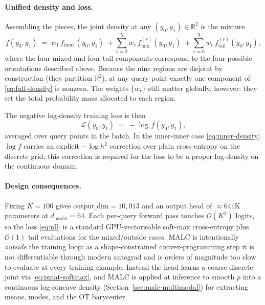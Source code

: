 \paragraph{Unified density and loss.}
Assembling the pieces, the joint density at any $(y_0, y_1) \in \mathbb{R}^{2}$
is the mixture
\begin{equation}
f(y_0, y_1)
\;=\;
w_{1}\, f_{\mathrm{inner}}(y_0, y_1)
\;+\!\sum_{r=2}^{5}\! w_{r}\, f^{(r)}_{\mathrm{mix}}(y_0, y_1)
\;+\!\sum_{r=6}^{9}\! w_{r}\, f^{(r)}_{\mathrm{tail}}(y_0, y_1),
\label{eq:full-density}
\end{equation}
where the four mixed and four tail components correspond to the four
possible orientations described above. Because the nine regions are
disjoint by construction (they partition $\mathbb{R}^{2}$), at any query
point exactly one component of \eqref{eq:full-density} is nonzero. The
weights $\{w_r\}$ still matter globally, however: they set the total
probability mass allocated to each region.

The negative log-density training loss is then
\begin{equation}
\mathcal{L}(y_0, y_1)
\;=\;
-\log\, f(y_0, y_1),
\label{eq:nll}
\end{equation}
averaged over query points in the batch. In the inner-inner case
\eqref{eq:inner-density} $\log f$ carries an explicit
$-\log h^{2}$ correction over plain cross-entropy on the discrete grid;
this correction is required for the loss to be a proper log-density on
the continuous domain.

\paragraph{Design consequences.}
Fixing $K = 100$ gives $\mathrm{output\_dim} = 10{,}013$ and an output
head of $\approx 641\text{K}$ parameters at $d_{\mathrm{model}}=64$.
Each per-query forward pass touches
$\mathcal{O}(K^{2})$ logits, so the loss \eqref{eq:nll} is a standard
GPU-vectorisable soft-max cross-entropy plus $\mathcal{O}(1)$ tail
evaluations for the mixed/outside cases.
MALC is intentionally \emph{outside} the training loop: as a shape-constrained
convex-programming step it is not differentiable through modern autograd
and is orders of magnitude too slow to evaluate at every training
example. Instead the head learns a coarse discrete joint via
\eqref{eq:pmat-softmax}, and MALC is applied at inference to smooth
$p$ into a continuous log-concave density (Section~\ref{sec:malc-multimodal})
for extracting means, modes, and the OT barycenter.
